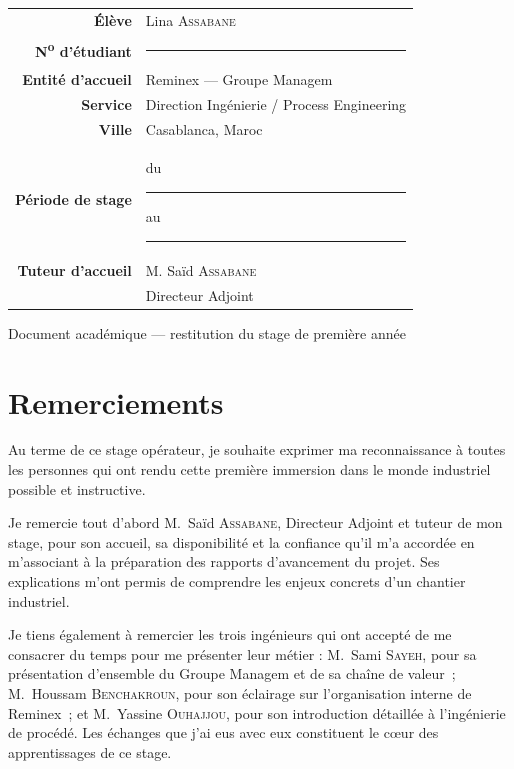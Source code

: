 \documentclass[12pt,a4paper,oneside]{report}
\begin{document}
\begin{titlepage}
\begin{minipage}{0.9\textwidth}
\centering
\renewcommand{\arraystretch}{1.4}
\begin{tabular}{r l}
\textbf{Élève} & Lina \textsc{Assabane} \\
\textbf{N\textsuperscript{o} d'étudiant} & \rule{3cm}{0.4pt} \\
\textbf{Entité d'accueil} & Reminex --- Groupe Managem \\
\textbf{Service} & Direction Ingénierie / Process Engineering \\
\textbf{Ville} & Casablanca, Maroc \\
\textbf{Période de stage} & du \rule{2cm}{0.4pt} au \rule{2cm}{0.4pt} \\
\textbf{Tuteur d'accueil} & M. Saïd \textsc{Assabane} \\
 & Directeur Adjoint \\
\end{tabular}
\end{minipage}

\vfill
{\footnotesize\color{softgray}Document académique --- restitution du stage de première année}
\end{titlepage}


\chapter*{Remerciements}

Au terme de ce stage opérateur, je souhaite exprimer ma reconnaissance à toutes les personnes qui ont rendu cette première immersion dans le monde industriel possible et instructive.

Je remercie tout d'abord M.~Saïd \textsc{Assabane}, Directeur Adjoint et tuteur de mon stage, pour son accueil, sa disponibilité et la confiance qu'il m'a accordée en m'associant à la préparation des rapports d'avancement du projet. Ses explications m'ont permis de comprendre les enjeux concrets d'un chantier industriel.

Je tiens également à remercier les trois ingénieurs qui ont accepté de me consacrer du temps pour me présenter leur métier : M.~Sami \textsc{Sayeh}, pour sa présentation d'ensemble du Groupe Managem et de sa chaîne de valeur~; M.~Houssam \textsc{Benchakroun}, pour son éclairage sur l'organisation interne de Reminex~; et M.~Yassine \textsc{Ouhajjou}, pour son introduction détaillée à l'ingénierie de procédé. Les échanges que j'ai eus avec eux constituent le cœur des apprentissages de ce stage.
\end{document}
